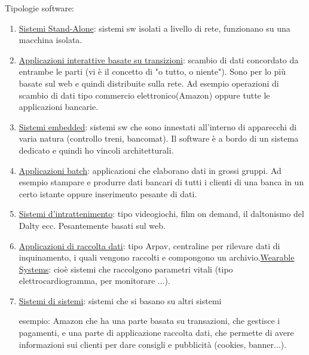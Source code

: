 \documentclass[a4paper, 10pt]{article}
\begin{document}
\begin{enumerate}
		\noindent
		Tipologie software:
		\begin{enumerate}
			\item \underline{Sistemi Stand-Alone}: sistemi sw isolati a livello di rete, funzionano su una macchina isolata.
			\item \underline{Applicazioni interattive basate su transizioni}: scambio di dati concordato
			da entrambe le parti (vi è il concetto di "o tutto, o niente"). Sono per lo
			più basate sul web e quindi distribuite sulla rete. Ad esempio operazioni di scambio di dati tipo commercio elettronico(Amazon) oppure tutte le applicazioni bancarie.
			\item \underline{Sistemi embedded}: sistemi sw che sono innestati all'interno di apparecchi di varia natura (controllo treni, bancomat). Il software è a bordo di un sistema dedicato e quindi ho vincoli architetturali. 
			\item \underline{Applicazioni batch}: applicazioni che elaborano dati in grossi gruppi. Ad esempio stampare e produrre dati bancari di tutti i clienti di una banca in un certo istante oppure inserimento pesante di dati.
			\item \underline{Sistemi d'intrattenimento}: tipo videogiochi, film on demand, il daltonismo del Dalty ecc. Pesantemente basati sul web.
			\item \underline{Applicazioni di raccolta dati}: tipo Arpav, centraline per rilevare dati di inquinamento, i quali vengono raccolti e compongono un archivio.\underline{Wearable Systems}: cioè sistemi che raccolgono parametri vitali (tipo elettrocardiogramma, per monitorare ...).
			\item \underline{Sistemi di sistemi}: sistemi che si basano su altri sistemi
			
			esempio: Amazon che ha una parte basata su transazioni, che gestisce i pagamenti, e una parte di applicazione raccolta dati, che permette di avere informazioni sui clienti per dare consigli e pubblicità (cookies, banner...).
		\end{enumerate}
	\end{enumerate}
		
\end{document}

